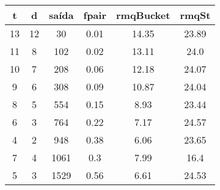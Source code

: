 \begin{tabular}{|c|c|c|c|c|c|}
\hline
\textbf{t} & \textbf{d} & \textbf{saída} & \textbf{fpair} & \textbf{rmqBucket} & \textbf{rmqSt}\\
\hline
13 & 12 & 30 & 0.01 & 14.35 & 23.89\\
\hline
11 & 8 & 102 & 0.02 & 13.11 & 24.0\\
\hline
10 & 7 & 208 & 0.06 & 12.18 & 24.07\\
\hline
9 & 6 & 308 & 0.09 & 10.87 & 24.04\\
\hline
8 & 5 & 554 & 0.15 & 8.93 & 23.44\\
\hline
6 & 3 & 764 & 0.22 & 7.17 & 24.57\\
\hline
4 & 2 & 948 & 0.38 & 6.06 & 23.65\\
\hline
7 & 4 & 1061 & 0.3 & 7.99 & 16.4\\
\hline
5 & 3 & 1529 & 0.56 & 6.61 & 24.53\\
\hline
\end{tabular}
